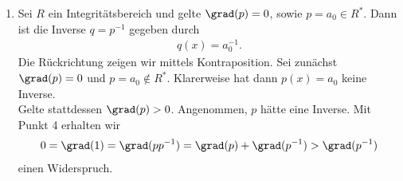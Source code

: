 \begin{solution}
\begin{enumerate}
  \item Sei $R$ ein Integritätsbereich und gelte $\grad(p) = 0$, sowie $p = a_0 \in R^*$.
  Dann ist die Inverse $q = p^{-1}$ gegeben durch
  \begin{align*}
    q(x) = a_0^{-1}.
  \end{align*}
  Die Rückrichtung zeigen wir mittels Kontraposition.
  Sei zunächst $\grad(p) = 0$ und $p = a_0 \notin R^*$.
  Klarerweise hat dann $p(x) = a_0$ keine Inverse. \\
  Gelte stattdessen $\grad(p) > 0$. Angenommen, $p$ hätte eine Inverse.
  Mit Punkt 4 erhalten wir
  \begin{align*}
    0 = \grad(1) = \grad(pp^{-1}) = \grad(p) + \grad(p^{-1}) > \grad(p^{-1})
  \end{align*}
  einen Widerspruch.
\end{enumerate}
\end{solution}
